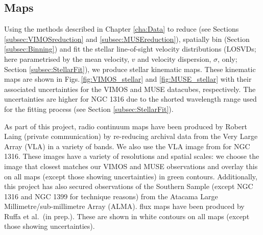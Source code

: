	\subsection{Maps}
		\label{subsec:maps}
		Using the methods described in Chapter \ref{cha:Data} to reduce (see Sections \ref{subsec:VIMOSreduction} and \ref{subsec:MUSEreduction}), spatially bin (Section \ref{subsec:Binning}) and fit the stellar line-of-sight velocity distributions (LOSVDs; here parametrised by the mean velocity, $v$ and velocity dispersion, $\sigma$, only; Section \ref{subsec:StellarFit}), we produce stellar kinematic maps. These kinematic maps are shown in Figs.\,\ref{fig:VIMOS_stellar} and \ref{fig:MUSE_stellar} with their associated uncertainties for the VIMOS and MUSE datacubes, respectively. The uncertainties are higher for NGC 1316 due to the shorted wavelength range used for the fitting process (see Section \ref{subsec:StellarFit}).

		As part of this project, radio continuum maps have been produced by Robert Laing (private communication) by re-reducing archival data from the Very Large Array (VLA) in a variety of bands. We also use the VLA image from \citet{Lanz2010} for NGC 1316. These images have a variety of resolutions and spatial scales: we choose the image that closest matches our VIMOS and MUSE observations and overlay this on all maps (except those showing uncertainties) in green contours. Additionally, this project has also secured observations of the Southern Sample (except NGC 1316 and NGC 1399 for technique reasons) from the Atacama Large Millimetre/sub-millimetre Array (ALMA).  flux maps have been produced by Ruffa et al.\ (in prep.). These are shown in white contours on all maps (except those showing uncertainties). 

